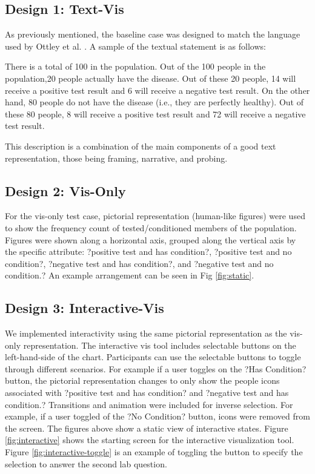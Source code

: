 \subsection{Design 1: Text-Vis}
As previously mentioned, the baseline case was designed to match the language used by Ottley et al. \cite{Ottley2016}. A sample of the textual statement is as follows:

\begin{displayquote}
    There is a total of 100 in the population. Out of the 100 people in the population,20 people actually have the disease. Out of these 20 people, 14 will receive a positive test result and 6 will receive a negative test result. On the other hand, 80 people do not have the disease (i.e., they are perfectly healthy). Out of these 80 people, 8 will receive a positive test result and 72 will receive a negative test result.
\end{displayquote}

This description is a combination of the main components of a good text representation, those being framing, narrative, and probing.

\subsection{Design 2: Vis-Only}

\staticVis

For the vis-only test case, pictorial representation (human-like figures) were used to show the frequency count of tested/conditioned members of the population. Figures were shown along a horizontal axis, grouped along the vertical axis by the specific attribute: ?positive test and has condition?, ?positive test and no condition?, ?negative test and has condition?, and ?negative test and no condition.? An example arrangement can be seen in Fig \ref{fig:static}. 

\subsection{Design 3: Interactive-Vis}

\interactiveVis

\interactiveVisToggle

We implemented interactivity using the same pictorial representation as the
vis-only representation. The interactive vis tool includes selectable buttons
on the left-hand-side of the chart. Participants can use the selectable
buttons to toggle through different scenarios. For example if a user toggles
on the ?Has Condition? button, the pictorial representation changes to only
show the people icons associated with ?positive test and has condition? and
?negative test and has condition.? Transitions and animation were included
for inverse selection. For example, if a user toggled of the ?No Condition?
button, icons were removed from the screen. The figures above show a static
view of interactive states. Figure \ref{fig:interactive} shows the starting screen for the
interactive visualization tool. Figure \ref{fig:interactive-toggle} is an example of toggling the button
to specify the selection to answer the second lab question.


